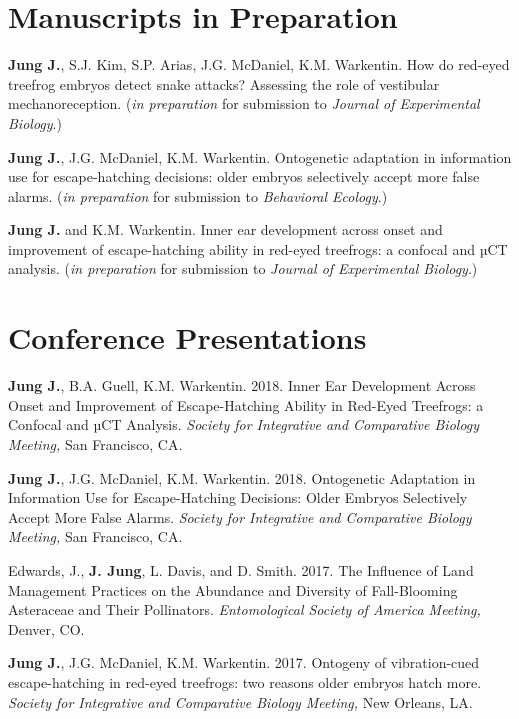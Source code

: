 \documentclass[margin,line]{res}
\begin{document}
\begin{resume}
\section{\sc Manuscripts in Preparation}
{\bf Jung J.}, S.J. Kim, S.P. Arias, J.G. McDaniel, K.M. Warkentin. {How do red-eyed treefrog embryos detect snake attacks? Assessing the role of vestibular mechanoreception.} ({\it in preparation} for submission to {\it Journal of Experimental Biology}.)

\vspace{-.3cm}
{\bf Jung J.}, J.G. McDaniel, K.M. Warkentin. {Ontogenetic adaptation in information use for escape-hatching decisions: older embryos selectively accept more false alarms.} ({\it in preparation} for submission to {\it Behavioral Ecology}.)

\vspace{-.3cm}
{\bf Jung J.} and K.M. Warkentin. {Inner ear development across onset and improvement of escape-hatching ability in red-eyed treefrogs: a confocal and µCT analysis.} ({\it in preparation} for submission to {\it Journal of Experimental Biology}.)

\section{\sc Conference Presentations}

{\bf Jung J.}, B.A. Guell, K.M. Warkentin. {2018.} {Inner Ear Development Across Onset and Improvement of Escape-Hatching Ability in Red-Eyed Treefrogs: a Confocal and µCT Analysis.} {\it Society for Integrative and Comparative Biology Meeting,} {San Francisco, CA.}

\vspace{-.25cm}
{\bf Jung J.}, J.G. McDaniel, K.M. Warkentin. {2018.} {Ontogenetic Adaptation in Information Use for Escape-Hatching Decisions: Older Embryos Selectively Accept More False Alarms.} {\it Society for Integrative and Comparative Biology Meeting,} {San Francisco, CA.}

\vspace{-.25cm}
Edwards, J., {\bf J. Jung}, L. Davis, and D. Smith. {2017.} {The Influence of Land Management Practices on the Abundance and Diversity of Fall-Blooming Asteraceae and Their Pollinators.} {\it Entomological Society of America Meeting,} {Denver, CO.}

\vspace{-.25cm}
{\bf Jung J.}, J.G. McDaniel, K.M. Warkentin. {2017.} {Ontogeny of vibration-cued escape-hatching in red-eyed treefrogs: two reasons older embryos hatch more.} {\it Society for Integrative and Comparative Biology Meeting,} {New Orleans, LA.}


\end{resume}
\end{document}
